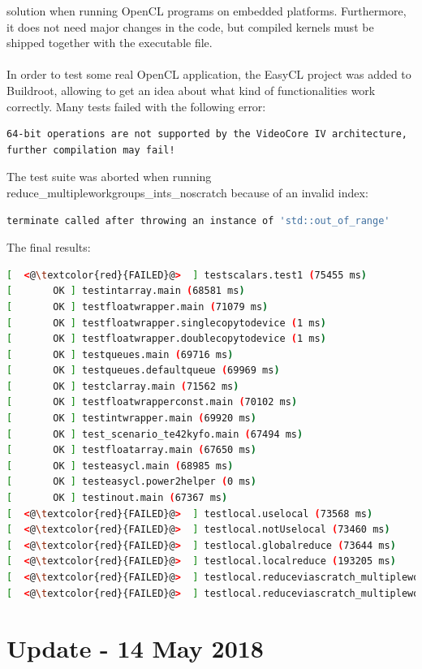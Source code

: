\documentclass[12pt,a4paper,oneside]{article}
\begin{document}
solution when running OpenCL programs on embedded platforms. Furthermore, it does
not need major changes in the code, but compiled kernels must be shipped together
with the executable file.\\\\
In order to test some real OpenCL application, the EasyCL project was added to
Buildroot, allowing to get an idea about what kind of functionalities work
correctly. Many tests failed with the following error:
\begin{lstlisting}[language=sh,caption={},captionpos=b,keywords={}]
64-bit operations are not supported by the VideoCore IV architecture,
further compilation may fail!
\end{lstlisting}
The test suite was aborted when running {\selectfont reduce\_multipleworkgroups\_ints\_noscratch}
because of an invalid index:
\begin{lstlisting}[language=sh,caption={},captionpos=b,keywords={}]
terminate called after throwing an instance of 'std::out_of_range'
\end{lstlisting}
The final results:
\begin{lstlisting}[language=sh,caption={EasyCL tests},captionpos=b,keywords={OK}]
[  <@\textcolor{red}{FAILED}@>  ] testscalars.test1 (75455 ms)
[       OK ] testintarray.main (68581 ms)
[       OK ] testfloatwrapper.main (71079 ms)
[       OK ] testfloatwrapper.singlecopytodevice (1 ms)
[       OK ] testfloatwrapper.doublecopytodevice (1 ms)
[       OK ] testqueues.main (69716 ms)
[       OK ] testqueues.defaultqueue (69969 ms)
[       OK ] testclarray.main (71562 ms)
[       OK ] testfloatwrapperconst.main (70102 ms)
[       OK ] testintwrapper.main (69920 ms)
[       OK ] test_scenario_te42kyfo.main (67494 ms)
[       OK ] testfloatarray.main (67650 ms)
[       OK ] testeasycl.main (68985 ms)
[       OK ] testeasycl.power2helper (0 ms)
[       OK ] testinout.main (67367 ms)
[  <@\textcolor{red}{FAILED}@>  ] testlocal.uselocal (73568 ms)
[  <@\textcolor{red}{FAILED}@>  ] testlocal.notUselocal (73460 ms)
[  <@\textcolor{red}{FAILED}@>  ] testlocal.globalreduce (73644 ms)
[  <@\textcolor{red}{FAILED}@>  ] testlocal.localreduce (193205 ms)
[  <@\textcolor{red}{FAILED}@>  ] testlocal.reduceviascratch_multipleworkgroups (192997 ms)
[  <@\textcolor{red}{FAILED}@>  ] testlocal.reduceviascratch_multipleworkgroups_ints (194560 ms)
\end{lstlisting}

\newpage
\section*{Update - 14 May 2018}
\end{document}
